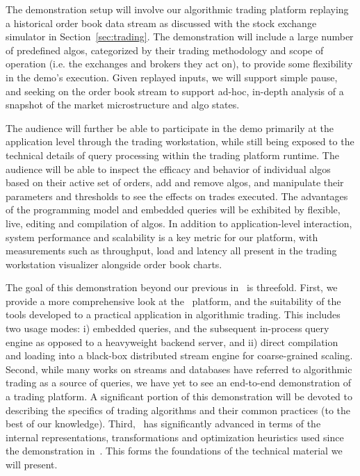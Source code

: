The demonstration setup will involve our algorithmic trading platform replaying
a historical order book data stream as discussed with the stock exchange
simulator in Section~\ref{sec:trading}. The demonstration will include a large
number of predefined algos, categorized by their trading methodology and scope
of operation (i.e. the exchanges and brokers they act on), to provide some
flexibility in the demo's execution. Given replayed inputs, we will
support simple pause, and seeking on the order book stream to support ad-hoc,
in-depth analysis of a snapshot of the market microstructure and algo states.

The audience will further be able to participate in the demo primarily at the
application level through the trading workstation, while still being exposed to
the technical details of query processing within the trading platform runtime.
The audience will be able to inspect the efficacy and behavior of individual
algos based on their active set of orders, add and remove algos, and manipulate
their parameters and thresholds to see the effects on trades executed. The
advantages of the programming model and embedded queries will be exhibited by
flexible, live, editing and compilation of algos. In addition to
application-level interaction, system performance and scalability is a key
metric for our platform, with measurements such as throughput, load and latency
all present in the trading workstation visualizer alongside order book charts.

The goal of this demonstration beyond our previous in~\cite{ahmad-vldb:09} is
threefold. First, we provide a more comprehensive look at the \compiler\
platform, and the suitability of the tools developed to a practical application
in algorithmic trading. This includes two usage modes: i) embedded queries, and
the subsequent in-process query engine as opposed to a heavyweight backend
server, and ii) direct compilation and loading into a black-box distributed
stream engine for coarse-grained scaling. Second, while many works on streams
and databases have referred to algorithmic trading as a source of
queries, we have yet to see an end-to-end demonstration of a trading platform.
A significant portion of this demonstration will be devoted to describing the
specifics of trading algorithms and their common practices (to the best of our
knowledge). Third, \compiler\ has significantly advanced in terms of the
internal representations, transformations and optimization heuristics used since
the demonstration in~\cite{ahmad-vldb:09}. This forms the foundations of the
technical material we will present.
